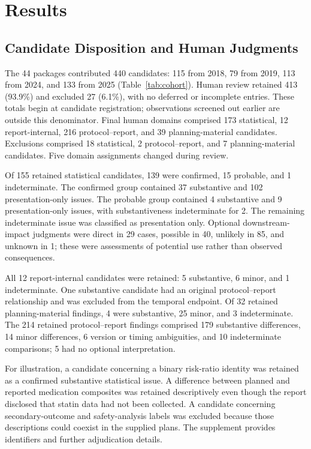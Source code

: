 \section{Results}
\label{sec:results}

\subsection{Candidate Disposition and Human Judgments}

The 44 packages contributed 440 candidates: 115 from 2018, 79 from 2019, 113 from 2024, and 133 from 2025 (Table~\ref{tab:cohort}). Human review retained 413 (93.9\%) and excluded 27 (6.1\%), with no deferred or incomplete entries. These totals begin at candidate registration; observations screened out earlier are outside this denominator. Final human domains comprised 173 statistical, 12 report-internal, 216 protocol--report, and 39 planning-material candidates. Exclusions comprised 18 statistical, 2 protocol--report, and 7 planning-material candidates. Five domain assignments changed during review.

Of 155 retained statistical candidates, 139 were confirmed, 15 probable, and 1 indeterminate. The confirmed group contained 37 substantive and 102 presentation-only issues. The probable group contained 4 substantive and 9 presentation-only issues, with substantiveness indeterminate for 2. The remaining indeterminate issue was classified as presentation only. Optional downstream-impact judgments were direct in 29 cases, possible in 40, unlikely in 85, and unknown in 1; these were assessments of potential use rather than observed consequences.

All 12 report-internal candidates were retained: 5 substantive, 6 minor, and 1 indeterminate. One substantive candidate had an original protocol--report relationship and was excluded from the temporal endpoint. Of 32 retained planning-material findings, 4 were substantive, 25 minor, and 3 indeterminate. The 214 retained protocol--report findings comprised 179 substantive differences, 14 minor differences, 6 version or timing ambiguities, and 10 indeterminate comparisons; 5 had no optional interpretation.

For illustration, a candidate concerning a binary risk-ratio identity was retained as a confirmed substantive statistical issue. A difference between planned and reported medication composites was retained descriptively even though the report disclosed that statin data had not been collected. A candidate concerning secondary-outcome and safety-analysis labels was excluded because those descriptions could coexist in the supplied plans. The supplement provides identifiers and further adjudication details.

